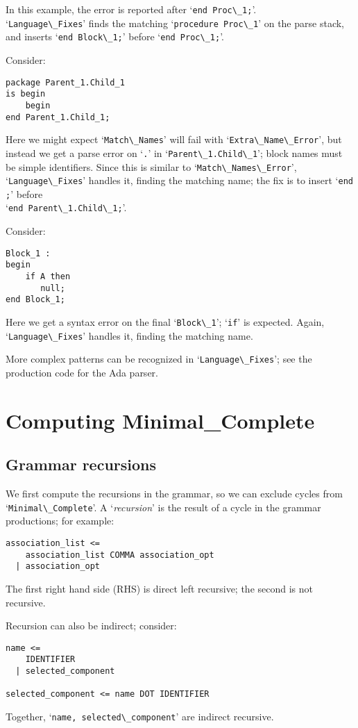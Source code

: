 \documentclass{article}
\newcommand{\code}[1]{`\lstinline|#1|'}
\begin{document}
In this example, the error is reported after \code{end Proc\_1;}.\\
\code{Language\_Fixes} finds the matching \code{procedure Proc\_1} on
the parse stack, and inserts \code{end Block\_1;} before
\code{end Proc\_1;}.

Consider:
\begin{lstlisting}
package Parent_1.Child_1
is begin
    begin
end Parent_1.Child_1;
\end{lstlisting}
Here we might expect \code{Match\_Names} will fail with
\code{Extra\_Name\_Error}, but instead we get a parse error on \code{.}
in \code{Parent\_1.Child\_1}; block names must be simple identifiers.
Since this is similar to \code{Match\_Names\_Error},
\code{Language\_Fixes} handles it, finding the matching name; the
fix is to insert \code{end ;} before\\ \code{end Parent\_1.Child\_1;}.

Consider:
\begin{lstlisting}
Block_1 :
begin
    if A then
       null;
end Block_1;
\end{lstlisting}
Here we get a syntax error on the final \code{Block\_1}; \code{if} is
expected. Again, \code{Language\_Fixes} handles it, finding the
matching name.

More complex patterns can be recognized in \code{Language\_Fixes}; see
the production code for the Ada parser.

\section{Computing Minimal\_Complete}
\label{minimal-complete-compute}

\subsection{Grammar recursions}
We first compute the recursions in the grammar, so we can exclude
cycles from \code{Minimal\_Complete}. A `{\it recursion}' is
the result of a cycle in the grammar productions; for example:
\begin{verbatim}
association_list <=
    association_list COMMA association_opt
  | association_opt
\end{verbatim}
The first right hand side (RHS) is direct left recursive; the second
is not recursive.

Recursion can also be indirect; consider:
\begin{verbatim}
name <=
    IDENTIFIER
  | selected_component

selected_component <= name DOT IDENTIFIER
\end{verbatim}
Together, \code{name, selected\_component} are indirect recursive.
\end{document}
